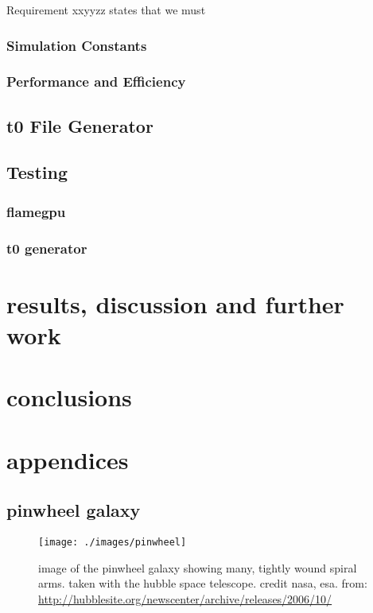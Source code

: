 \documentclass[11pt,a4paper]{article}
\begin{document}
Requirement xxyyzz states that we must

\subsubsection{Simulation Constants}

\subsubsection{Performance and Efficiency}

\subsection{t0 File Generator}

\subsection{Testing}


\subsubsection{flamegpu}
\subsubsection{t0 generator}

\section{results, discussion and further work}

\section{conclusions}


\newpage
{}



\newpage
\appendix





\section{appendices}

\subsection{pinwheel galaxy}
\label{pinwheel}
\begin{figure}[h]
\texttt{[image: ./images/pinwheel]}
\caption[the pinwheel galaxy]{image of the pinwheel galaxy showing many, tightly wound spiral arms. taken with the hubble space telescope. credit nasa, esa. from: \url{http://hubblesite.org/newscenter/archive/releases/2006/10/}}
\end{figure}
\end{document}
